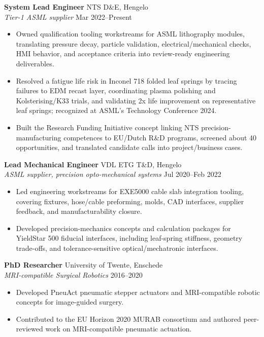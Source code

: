 \documentclass[10pt,a4paper]{article}
\begin{document}
\textbf{System Lead Engineer} \hfill NTS D\&E, Hengelo \\
{\small\textit{Tier-1 ASML supplier}} \hfill {\small Mar 2022--Present}
\begin{itemize}
 \item Owned qualification tooling workstreams for ASML lithography modules, translating pressure decay, particle validation, electrical/mechanical checks, HMI behavior, and acceptance criteria into review-ready engineering deliverables.
 \item Resolved a fatigue life risk in Inconel 718 folded leaf springs by tracing failures to EDM recast layer, coordinating plasma polishing and Kolsterising/K33 trials, and validating 2x life improvement on representative leaf springs; recognized at ASML's Technology Conference 2024.
 \item Built the Research Funding Initiative concept linking NTS precision-manufacturing competences to EU/Dutch R\&D programs, screened about 40 opportunities, and translated candidate calls into project/business cases.
\end{itemize}

\vspace{4pt}
\textbf{Lead Mechanical Engineer} \hfill VDL ETG T\&D, Hengelo \\
{\small\textit{ASML supplier, precision opto-mechanical systems}} \hfill {\small Jul 2020--Feb 2022}
\begin{itemize}
 \item Led engineering workstreams for EXE5000 cable slab integration tooling, covering fixtures, hose/cable preforming, molds, CAD interfaces, supplier feedback, and manufacturability closure.
 \item Developed precision-mechanics concepts and calculation packages for YieldStar 500 fiducial interfaces, including leaf-spring stiffness, geometry trade-offs, and tolerance-sensitive optical/mechatronic interfaces.
\end{itemize}

\vspace{4pt}
\textbf{PhD Researcher} \hfill University of Twente, Enschede \\
{\small\textit{MRI-compatible Surgical Robotics}} \hfill {\small 2016--2020}
\begin{itemize}
 \item Developed PneuAct pneumatic stepper actuators and MRI-compatible robotic concepts for image-guided surgery.
 \item Contributed to the EU Horizon 2020 MURAB consortium and authored peer-reviewed work on MRI-compatible pneumatic actuation.
\end{itemize}
\end{document}
